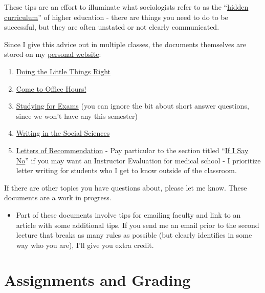 \documentclass[
]{book}
\providecommand{\tightlist}{%
  \setlength{\itemsep}{0pt}\setlength{\parskip}{0pt}}
\newenvironment{rmdblock}[1]
  {\begin{shaded*}
  \begin{itemize}
  \renewcommand{\labelitemi}{
    \raisebox{-.7\height}[0pt][0pt]{
      {\setkeys{Gin}{width=3em,keepaspectratio}\texttt{[image: images/\#1]}}
    }
  }
  \item
  }
  {
  \end{itemize}
  \end{shaded*}
  }
\newenvironment{rmdnote}
  {\begin{rmdblock}{note}}
  {\end{rmdblock}}
\begin{document}
These tips are an effort to illuminate what sociologists refer to as the ``\href{https://books.google.com/books?hl=en\&lr=\&id=5r-TAgAAQBAJ\&oi=fnd\&pg=PP1\&dq=hidden+curriculum\#v=onepage\&q=hidden\%20curriculum\&f=false}{hidden curriculum}'' of higher education - there are things you need to do to be successful, but they are often unstated or not clearly communicated.

Since I give this advice out in multiple classes, the documents themselves are stored on my \href{https://chris-prener.github.io}{personal website}:

\begin{enumerate}
\def\labelenumi{\arabic{enumi}.}
\tightlist
\item
  \href{https://chris-prener.github.io/resources/students/little-things/}{Doing the Little Things Right}
\item
  \href{https://chris-prener.github.io/resources/students/office-hours/}{Come to Office Hours!}
\item
  \href{https://chris-prener.github.io/resources/students/exams/}{Studying for Exams} (you can ignore the bit about short answer questions, since we won't have any this semester)
\item
  \href{https://chris-prener.github.io/resources/students/writing/}{Writing in the Social Sciences}
\item
  \href{https://chris-prener.github.io/resources/students/exams/}{Letters of Recommendation} - Pay particular to the section titled ``\href{https://chris-prener.github.io/resources/students/letters/\#if-i-say-no}{If I Say No}'' if you may want an Instructor Evaluation for medical school - I prioritize letter writing for students who I get to know outside of the classroom.
\end{enumerate}

If there are other topics you have questions about, please let me know. These documents are a work in progress.

\begin{rmdnote}
Part of these documents involve tips for emailing faculty and link to an
article with some additional tips. If you send me an email prior to the
second lecture that breaks as many rules as possible (but clearly
identifies in some way who you are), I'll give you extra credit.
\end{rmdnote}

\hypertarget{assignments-and-grading}{%
\chapter{Assignments and Grading}\label{assignments-and-grading}}
\end{document}
